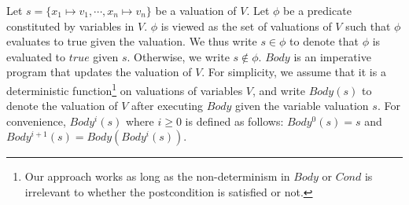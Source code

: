 Let $s = \{ x_1 \mapsto v_1, \cdots, x_n \mapsto v_n \}$ be a valuation of $V$. Let $\phi$ be a predicate constituted by variables in $V$. $\phi$ is viewed as the set of valuations of $V$ such that $\phi$ evaluates to true given the valuation. We thus write $s \in \phi$ to denote that $\phi$ is evaluated to $true$ given $s$. Otherwise, we write $s \not \in \phi$.
$Body$ is an imperative program that updates the valuation of $V$. For simplicity, we assume that it is a deterministic function\footnote{Our approach works as long as the non-determinism in $Body$ or $Cond$ is irrelevant to whether the postcondition is satisfied or not.} on valuations of variables $V$, and write $Body(s)$ to denote the valuation of $V$ after executing $Body$ given the variable valuation $s$. For convenience, $Body^i(s)$ where $i \geq 0$ is defined as follows: $Body^0(s) = s$ and $Body^{i+1}(s) = Body(Body^i(s))$.

